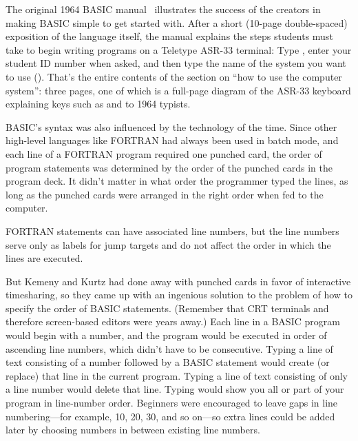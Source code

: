 
The original 1964 BASIC manual~\cite[p. 14]{dartmouth_basic_manual}
illustrates the success of the creators in making BASIC simple to get
started with.
After a short (10-page double-spaced) exposition of the language itself, the
manual explains the steps students must take to begin writing programs
on a Teletype ASR-33 terminal: Type , enter your student ID
number when asked, and then type the name of the system you want to use
().
That's the entire contents of the section on ``how to use the computer
system'': three pages, one of which is a full-page diagram of the ASR-33
keyboard explaining keys such as  and  to 1964
typists.




BASIC's syntax was also influenced by the technology of the time.  
Since other high-level languages like FORTRAN had always been used in
batch mode, and each line of a FORTRAN program 
required one punched card, the order of program statements was
determined by the order of the punched cards in the program deck.
It
didn't matter in what order the programmer typed the lines, as long as
the punched cards were arranged in the right order when fed to the computer.
\begin{sidebar}{}
FORTRAN statements can have associated line numbers, but the line
numbers serve only as labels for jump targets and do not affect the
order in which the lines are executed.
\end{sidebar}
But 
Kemeny and Kurtz had done away with punched cards in favor of
interactive timesharing, so they
came up with an ingenious solution to the problem of
how to specify the order of BASIC statements.  (Remember that CRT
terminals and therefore screen-based editors were years away.)
Each line in a BASIC
program would begin with a number, and the program would be
executed in order of ascending line numbers, which didn't have to be
consecutive.  
Typing a line of text consisting of a number followed by a BASIC statement
would create (or replace) that line in the current program.
Typing a line of text consisting of only a line number would delete that line.
Typing  would show
you all or part of your program in line-number order.
Beginners were encouraged to leave gaps in line
numbering---for example, 10, 20, 30, and so on---so 
extra lines could be added later by choosing numbers in between
existing line numbers.

